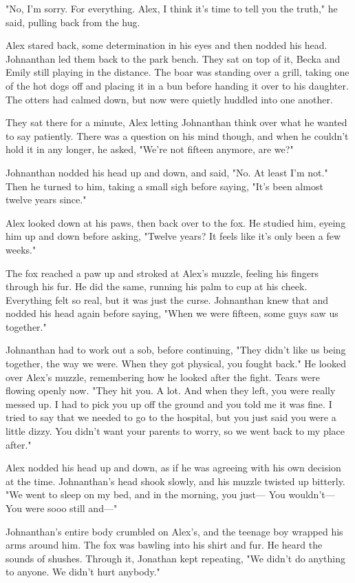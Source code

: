 "No, I'm sorry. For everything. Alex, I think it's time to tell you the truth," he said, pulling back from the hug.

Alex stared back, some determination in his eyes and then nodded his head. Johnanthan led them back to the park bench. They sat on top of it, Becka and Emily still playing in the distance. The boar was standing over a grill, taking one of the hot dogs off and placing it in a bun before handing it over to his daughter. The otters had calmed down, but now were quietly huddled into one another.

They sat there for a minute, Alex letting Johnanthan think over what he wanted to say patiently. There was a question on his mind though, and when he couldn't hold it in any longer, he asked, "We're not fifteen anymore, are we?"

Johnanthan nodded his head up and down, and said, "No. At least I'm not." Then he turned to him, taking a small sigh before saying, "It's been almost twelve years since."

Alex looked down at his paws, then back over to the fox. He studied him, eyeing him up and down before asking, "Twelve years? It feels like it's only been a few weeks."

The fox reached a paw up and stroked at Alex's muzzle, feeling his fingers through his fur. He did the same, running his palm to cup at his cheek. Everything felt so real, but it was just the curse. Johnanthan knew that and nodded his head again before saying, "When we were fifteen, some guys saw us together."

Johnanthan had to work out a sob, before continuing, "They didn't like us being together, the way we were. When they got physical, you fought back." He looked over Alex's muzzle, remembering how he looked after the fight. Tears were flowing openly now. "They hit you. A lot. And when they left, you were really messed up. I had to pick you up off the ground and you told me it was fine. I tried to say that we needed to go to the hospital, but you just said you were a little dizzy. You didn't want your parents to worry, so we went back to my place after."

Alex nodded his head up and down, as if he was agreeing with his own decision at the time. Johnanthan's head shook slowly, and his muzzle twisted up bitterly. "We went to sleep on my bed, and in the morning, you just--- You wouldn't--- You were sooo still and---"

Johnanthan's entire body crumbled on Alex's, and the teenage boy wrapped his arms around him. The fox was bawling into his shirt and fur. He heard the sounds of shushes. Through it, Jonathan kept repeating, "We didn't do anything to anyone. We didn't hurt anybody."

